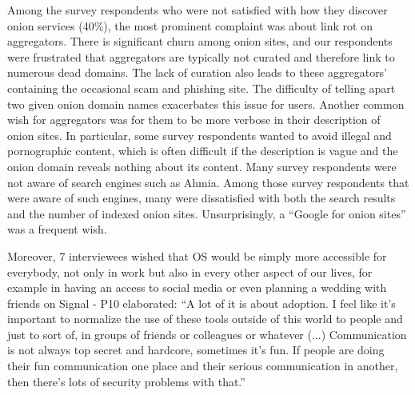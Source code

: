 Among the survey respondents who were not satisfied with how they discover onion
services (40\%), the most prominent complaint was about link rot on aggregators.
There is significant churn among onion sites, and our respondents were
frustrated that aggregators are typically not curated and therefore link to
numerous dead domains.  The lack of curation also leads to these aggregators'
containing the occasional scam and phishing site.  The difficulty of telling
apart two given onion domain names exacerbates this issue for users.  Another
common wish for aggregators was for them to be more verbose in their description
of onion sites.  In particular, some survey respondents wanted to avoid illegal
and pornographic content, which is often difficult if the description is vague
and the onion domain reveals nothing about its content.  Many survey respondents
were not aware of search engines such as Ahmia.  Among those survey respondents
that were aware of such engines, many were dissatisfied with both the search
results and the number of indexed onion sites.  Unsurprisingly, a ``Google for
onion sites'' was a frequent wish.

Moreover, 7 interviewees wished that OS would be simply more accessible for
everybody, not only in work but also in every other aspect of our lives, for
example in having an access to social media or even planning a wedding with
friends on Signal - P10 elaborated: ``A lot of it is about adoption. I feel like
it's important to normalize the use of these tools outside of this world to
people and just to sort of, in groups of friends or colleagues or whatever (...)
Communication is not always top secret and hardcore, sometimes it's fun. If
people are doing their fun communication one place and their serious
communication in another, then there's lots of security problems with that.'' 

